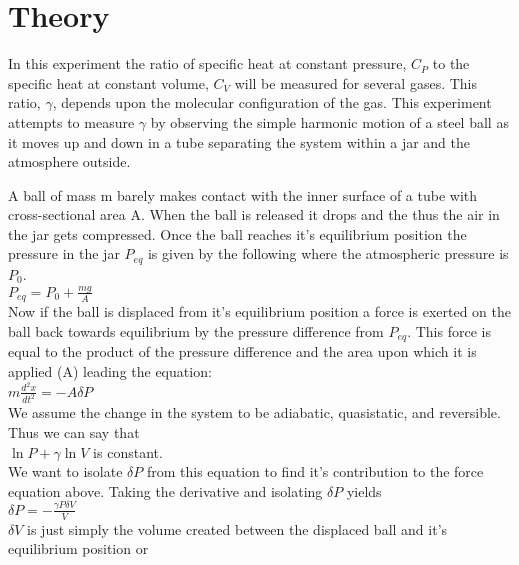 \documentclass{article}
\begin{document}


\section{Theory}
In this experiment the ratio of specific heat at constant pressure, $C_P$ to the specific heat at constant volume, $C_V$ will be measured for several gases. This ratio, $\gamma$, depends upon the molecular configuration of the gas. This experiment attempts to measure $\gamma$ by observing the simple harmonic motion of a steel ball as it moves up and down in a tube separating the system within a jar and the atmosphere outside.

A ball of mass m barely makes contact with the inner surface of a tube with cross-sectional area A. When the ball is released it drops and the thus the air in the jar gets compressed. Once the ball reaches it's equilibrium position the pressure in the jar $P_{eq}$ is given by the following where the atmospheric pressure is $P_0$.\\

$P_{eq} = P_0+\frac{mg}{A}$\\

Now if the ball is displaced from it's equilibrium position a force is exerted on the ball back towards equilibrium by the pressure difference from $P_{eq}$. This force is equal to the product of the pressure difference and the area upon which it is applied (A) leading the equation:\\

$m\frac{d^2x}{dt^2}=-A\delta P$\\

We assume the change in the system to be adiabatic, quasistatic, and reversible. Thus we can say that\\

$\ln{P}+\gamma\ln{V}$ is constant.\\

We want to isolate $\delta P$ from this equation to find it's contribution to the force equation above. Taking the derivative and isolating $\delta P$ yields\\

$\delta P = -\frac{\gamma P \delta V}{V}$\\

$\delta V$ is just simply the volume created between the displaced ball and it's equilibrium position or\\
\end{document}
